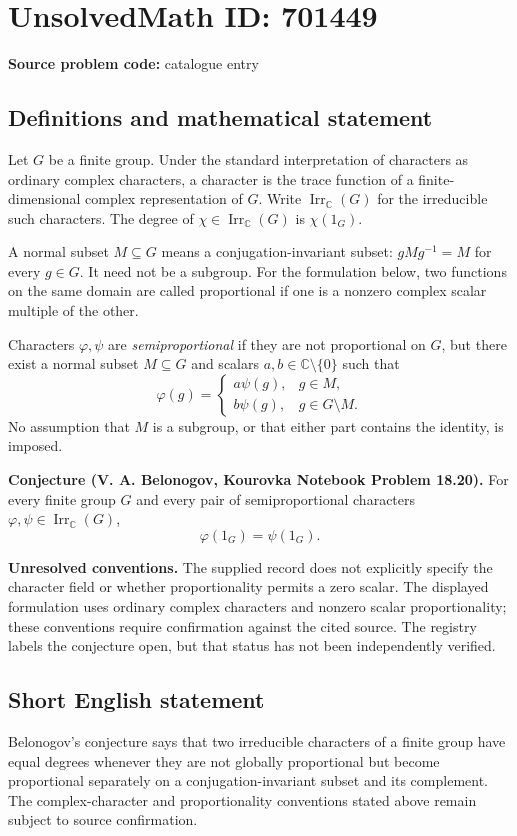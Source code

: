 \documentclass[11pt]{article}
\newcommand{\C}{\mathbb{C}}
\begin{document}
\section*{UnsolvedMath ID: 701449}
\textbf{Source problem code:} catalogue entry
\subsection{Definitions and mathematical statement}
Let \(G\) be a finite group. Under the standard interpretation of characters as ordinary complex characters, a character is the trace function of a finite-dimensional complex representation of \(G\). Write \(\operatorname{Irr}_{\C}(G)\) for the irreducible such characters. The degree of \(\chi\in\operatorname{Irr}_{\C}(G)\) is \(\chi(1_G)\).

A normal subset \(M\subseteq G\) means a conjugation-invariant subset: \(gMg^{-1}=M\) for every \(g\in G\). It need not be a subgroup. For the formulation below, two functions on the same domain are called proportional if one is a nonzero complex scalar multiple of the other.

Characters \(\varphi,\psi\) are \emph{semiproportional} if they are not proportional on \(G\), but there exist a normal subset \(M\subseteq G\) and scalars \(a,b\in\C\setminus\{0\}\) such that
\[
\varphi(g)=
\begin{cases}
a\psi(g),&g\in M,\\
b\psi(g),&g\in G\setminus M.
\end{cases}
\]
No assumption that \(M\) is a subgroup, or that either part contains the identity, is imposed.

\textbf{Conjecture (V. A. Belonogov, Kourovka Notebook Problem 18.20).} For every finite group \(G\) and every pair of semiproportional characters \(\varphi,\psi\in\operatorname{Irr}_{\C}(G)\),
\[
\varphi(1_G)=\psi(1_G).
\]

\textbf{Unresolved conventions.} The supplied record does not explicitly specify the character field or whether proportionality permits a zero scalar. The displayed formulation uses ordinary complex characters and nonzero scalar proportionality; these conventions require confirmation against the cited source. The registry labels the conjecture open, but that status has not been independently verified.
\subsection{Short English statement}
Belonogov's conjecture says that two irreducible characters of a finite group have equal degrees whenever they are not globally proportional but become proportional separately on a conjugation-invariant subset and its complement. The complex-character and proportionality conventions stated above remain subject to source confirmation.
\end{document}
